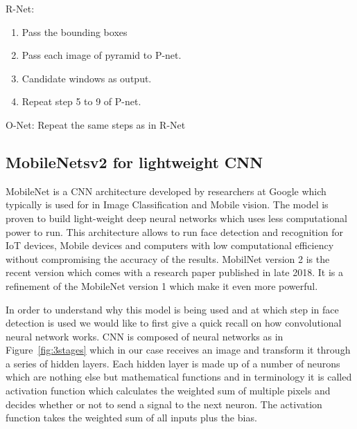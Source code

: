  R-Net:
\begin{enumerate}
  \vspace{-0.7cm} \item Pass the bounding boxes
   \vspace{-0.3cm} \item Pass each image of pyramid to P-net.
  \vspace{-0.3cm} \item Candidate windows as output.
  \vspace{-0.3cm} \item Repeat step 5 to 9 of P-net.
\end{enumerate}


 O-Net: Repeat the same steps as in R-Net

\subsection{MobileNetsv2 for lightweight CNN}

MobileNet is a CNN architecture developed by researchers at Google which typically is used for in Image Classification and Mobile vision. The model is proven to build light-weight deep neural networks which uses less computational power to run. This architecture allows to run face detection and recognition for IoT devices, Mobile devices and computers with low computational efficiency without compromising the accuracy of the results. MobilNet version 2 is the recent version which comes with a research paper published in late 2018. It is a refinement of the MobileNet version 1 which make it even more powerful. 

In order to understand why this model is being used and at which step in face detection is used we would like to first give a quick recall on how convolutional neural network works. CNN is composed of neural networks as in Figure~\ref{fig:3stages} which in our case receives an image  and transform it through a series of hidden layers. Each hidden layer is made up of a number of neurons which are nothing else but mathematical functions and in terminology it is called activation function which calculates the weighted sum of multiple pixels and decides whether or not to send a signal to the next neuron. The activation function takes the weighted sum of all inputs plus the bias.

